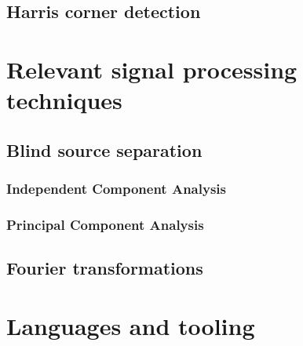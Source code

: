 \subsection{Harris corner detection}

\section{Relevant signal processing techniques}
\subsection{Blind source separation}
\label{ref:bss_prep}
\subsubsection{Independent Component Analysis}
\subsubsection{Principal Component Analysis}

\subsection{Fourier transformations}



\section{Languages and tooling}
